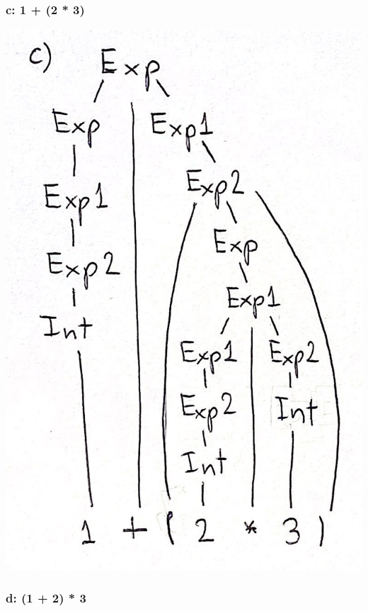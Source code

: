 \documentclass{article}
\theoremstyle{theorem}
\theoremstyle{definition}
\theoremstyle{remark}
\begin{document}
\subsubsection*{c: 1 + (2 * 3)}

\begin{center}
  \includegraphics*[scale=0.1]{treeC.jpg}
  \end{center}

\subsubsection*{d: (1 + 2) * 3}
\end{document}
